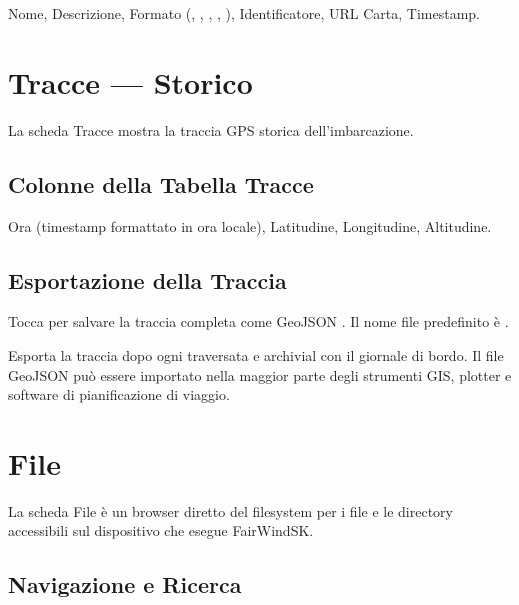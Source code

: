 Nome, Descrizione, Formato (, , ,
, ), Identificatore, URL Carta, Timestamp.

\chapter{Tracce --- Storico}
\label{ch:tracce}

La scheda Tracce mostra la traccia GPS storica dell'imbarcazione.


\section{Colonne della Tabella Tracce}

Ora (timestamp formattato in ora locale), Latitudine, Longitudine, Altitudine.

\section{Esportazione della Traccia}

Tocca  per salvare la traccia completa come GeoJSON .
Il nome file predefinito è .

\begin{tipbox}
Esporta la traccia dopo ogni traversata e archivial con il giornale di bordo.
Il file GeoJSON può essere importato nella maggior parte degli strumenti GIS,
plotter e software di pianificazione di viaggio.
\end{tipbox}

\chapter{File}
\label{ch:file}

La scheda File è un browser diretto del filesystem per i file e le directory
accessibili sul dispositivo che esegue FairWindSK.


\section{Navigazione e Ricerca}


